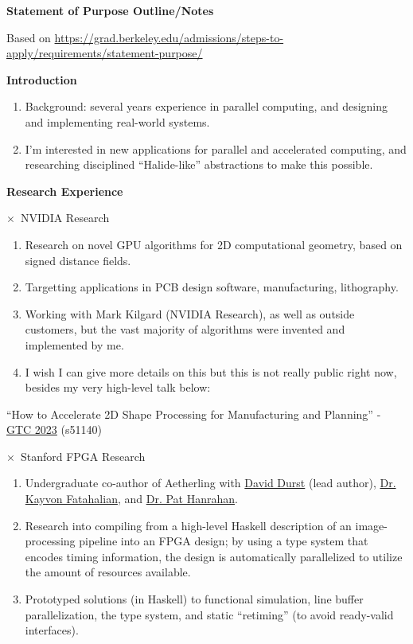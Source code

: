 \documentclass[11pt]{article}
\newcommand{\web}[1]{{\color{webColor} \small \url{#1}}}
\newcommand{\webText}[2]{{\color{webColor} \href{#1}{#2}}}
\newcommand{\myTitle}[1]{{ \vspace{2mm} \large \color{titleColor} \hspace{-12mm} \textbf{\textsf{#1}} \vspace{2mm}}}
\newcommand{\mySub}[1]{{\color{subColor}\hspace{-6mm} \( \times \)\ \textsf{#1}}}
\begin{document}
\raggedright
\reversemarginpar
\begin{center}
\textsf{\textbf{Statement of Purpose Outline/Notes}}
\end{center}

Based on \web{https://grad.berkeley.edu/admissions/steps-to-apply/requirements/statement-purpose/}

\myTitle{Introduction}

\begin{enumerate}
\item Background: several years experience in parallel computing, and
  designing and implementing real-world systems.
\item I'm interested in new applications for parallel and accelerated
  computing, and researching disciplined ``Halide-like'' abstractions
  to make this possible.
\end{enumerate}

\myTitle{Research Experience}

\mySub{NVIDIA Research}

\begin{enumerate}
\item Research on novel GPU algorithms for 2D computational geometry,
  based on signed distance fields.
\item Targetting applications in PCB design software, manufacturing, lithography.
\item Working with Mark Kilgard (NVIDIA Research), as well as outside
  customers, but the vast majority of algorithms were invented and
  implemented by me.
\item I wish I can give more details on this but this is not really
  public right now, besides my very high-level talk below:
\end{enumerate}

``How to Accelerate 2D Shape Processing for Manufacturing and Planning''
- \webText{https://www.nvidia.com/en-us/on-demand/session/gtcspring23-s51140/}{GTC 2023}
(s51140)
\filbreak

\mySub{Stanford FPGA Research}

\begin{enumerate}
\item Undergraduate co-author of Aetherling with
  \webText{https://david-durst.github.io/}{David Durst} (lead author),
  \webText{https://graphics.stanford.edu/~kayvonf/}{Dr. Kayvon Fatahalian},
  and \webText{https://graphics.stanford.edu/~hanrahan/}{Dr. Pat Hanrahan}.
\item Research into compiling from a high-level Haskell description of
  an image-processing pipeline into an FPGA design; by using a type
  system that encodes timing information, the design is automatically
  parallelized to utilize the amount of resources available.
\item Prototyped solutions (in Haskell) to functional simulation, line
  buffer parallelization, the type system, and static ``retiming'' (to
  avoid ready-valid interfaces).
\end{enumerate}
\end{document}
